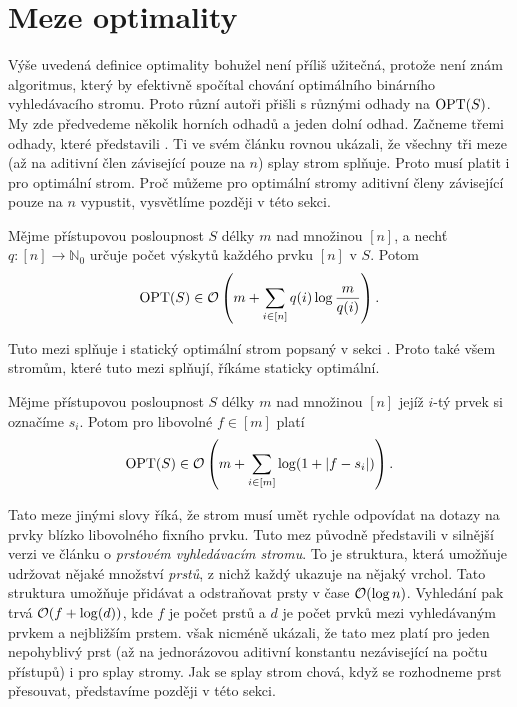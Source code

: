 \section{Meze optimality}

Výše uvedená definice optimality bohužel není příliš užitečná, protože není
znám algoritmus, který by efektivně spočítal chování optimálního binárního
vyhledávacího stromu. Proto různí autoři přišli s různými odhady na $\operatorname{OPT}(S)$.
My zde předvedeme několik horních odhadů a jeden dolní odhad. Začneme třemi
odhady, které představili \citet{splay}. Ti ve svém článku rovnou ukázali, že
všechny tři meze (až na aditivní člen závisející pouze na $n$) splay strom
splňuje. Proto musí platit i pro optimální strom. Proč můžeme pro optimální
stromy aditivní členy závisející pouze na $n$ vypustit, vysvětlíme později v této sekci.

\begin{veta}
Mějme přístupovou posloupnost $S$ délky $m$ nad množinou $[n]$, a nechť $q:[n]\rightarrow \mathbb N_0$ určuje počet výskytů každého prvku $[n]$ v $S$. Potom $$\operatorname{OPT}(S) \in \mathcal O\left(m + \sum_{i\in [n]}q(i)\log\frac m{q(i)}\right).$$
\end{veta}

Tuto mezi splňuje i statický optimální strom popsaný v sekci . Proto také všem stromům, které tuto mezi splňují, říkáme staticky optimální.  

\begin{veta}
Mějme přístupovou posloupnost $S$ délky $m$ nad množinou $[n]$ jejíž $i$-tý prvek si označíme $s_i$. Potom pro libovolné $f\in [m]$ platí $$\operatorname{OPT}(S) \in \mathcal O\left(m + \sum_{i\in [m]} \log(1 + |f-s_i|) \right).$$
\end{veta}

Tato meze jinými slovy říká, že strom musí umět rychle odpovídat na dotazy na
prvky blízko libovolného fixního prvku. Tuto mez původně představili v silnější
verzi \citet{fingersearchtree} ve článku o \emph{prstovém vyhledávacím stromu}. To je
struktura, která umožňuje udržovat nějaké množství \emph{prstů}, z nichž každý
ukazuje na nějaký vrchol. Tato struktura umožňuje přidávat a odstraňovat prsty
v čase $\mathcal O(\log n)$. Vyhledání pak trvá $\mathcal O(f+\log(d))$, kde $f$ je počet prstů
a $d$ je počet prvků mezi vyhledávaným prvkem a nejbližším prstem.
\citet{splay} však nicméně ukázali, že tato mez platí pro jeden nepohyblivý
prst (až na jednorázovou aditivní konstantu nezávisející na počtu přístupů) i
pro splay stromy. Jak se splay strom chová, když se rozhodneme prst přesouvat,
představíme později v této sekci. 


